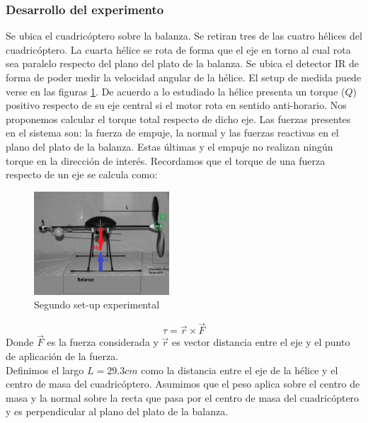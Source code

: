 \documentclass[main]{subfiles}
\begin{document}
\subsubsection*{Desarrollo del experimento}
\label{sub:torque}
Se ubica el cuadric\'optero sobre la balanza. Se retiran tres de las cuatro h\'elices del cuadric\'optero. La cuarta h\'elice se rota de forma que el eje en torno al cual rota sea paralelo respecto del plano del plato de la balanza. Se ubica el detector IR de forma de poder medir la velocidad angular de la h\'elice. El setup de medida puede verse en las figuras \ref{fig:setup2}. De acuerdo a lo estudiado la h\'elice presenta un torque ($Q$) positivo respecto de su eje central si el motor rota en sentido anti-horario. Nos proponemos calcular el torque total respecto de dicho eje. Las fuerzas presentes en el sistema son: la fuerza de empuje, la normal y las fuerzas reactivas en el plano del plato de la balanza. Estas \'ultimas y el empuje no realizan ning\'un torque en la direcci\'on de inter\'es. Recordamos que el torque de una fuerza respecto de un eje se calcula como:
\begin{figure}
  \vspace{0pt}
  \begin{center}
    \includegraphics[width=0.45\textwidth]{./pics_motores/set2.png}
  \end{center}
  \vspace{-15pt}
  \caption{Segundo set-up experimental}
  \label{fig:setup2}
  \vspace{10pt}
\end{figure}
$$
\tau=\vec{r} \times \vec{F} 
$$
Donde $\vec{F}$ es la fuerza considerada y $\vec{r}$ es vector distancia entre el eje y el punto de aplicaci\'on de la fuerza.\\

Definimos el largo $L=29.3cm$ como la distancia entre el eje de la h\'elice y el centro de masa del cuadric\'optero. Asumimos que el peso aplica sobre el centro de masa y la normal sobre la recta que pasa por el centro de masa del cuadric\'optero y es perpendicular al plano del plato de la balanza. 
\end{document}
